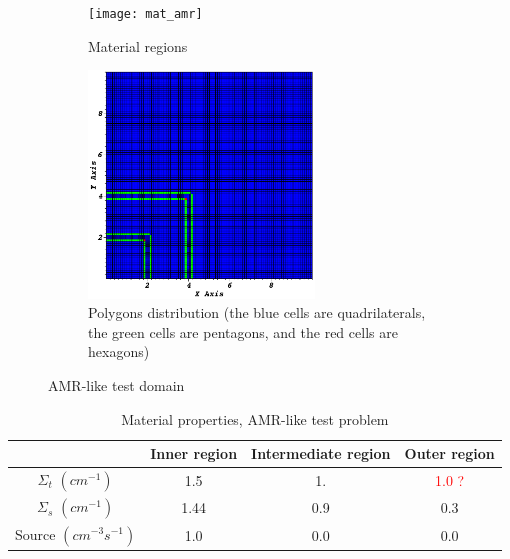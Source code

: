 %
\begin{figure}[!htbp]
  \centering
  \begin{subfigure}{0.75\textwidth}
    \centering
    \texttt{[image: mat\_amr]}
    \caption{Material regions}
  \end{subfigure}
  \begin{subfigure}{0.75\textwidth}
    \centering
    \includegraphics[width=6cm]{polygon_amr}
    \caption{Polygons distribution (the blue cells are quadrilaterals, the green cells are pentagons, and the red cells are hexagons)}
    \label{fig_pol_dist}
  \end{subfigure}
  \caption{AMR-like test domain}
  \label{zone_amr}
\end{figure}
%
\begin{table}
  \begin{center}
    \caption{Material properties, AMR-like test problem}
    \begin{tabular}{|c|c|c|c|}
      \hline
      & Inner region & Intermediate region & Outer region  \\ \hline
    $\Sigma_t$ $(cm^{-1})$ & 1.5  & 1.  & \textcolor{red}{1.0 ?} \\
    $\Sigma_s$ $(cm^{-1})$ & 1.44 & 0.9 & 0.3 \\
  Source $(cm^{-3}s^{-1})$ & 1.0  & 0.0 & 0.0 \\
      \hline
    \end{tabular}
    \label{prop_amr}
  \end{center}
\end{table}
%

